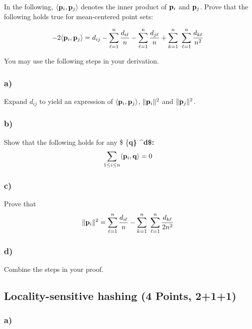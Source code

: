 \documentclass[11pt]{article}
\begin{document}
In the following, \(\langle {\bf p}_i , {\bf p}_j \rangle\) denotes the
inner product of \({\bf p}_i\) and \({\bf p}_j\). Prove that the
following holds true for mean-centered point sets:

\[-2 \langle {\bf p}_i , {\bf p}_j \rangle = 
d_{ij}
- \sum_{\ell=1}^{n} \frac{d_{i\ell}}{n}   
-  \sum_{\ell=1}^{n} \frac{d_{j\ell}}{n} 
+ \sum_{k=1}^{n}~ \sum_{\ell=1}^{n} \frac{d_{k\ell}}{n^2} 
\]

You may use the following steps in your derivation.

\hypertarget{a}{%
\subsubsection{a)}\label{a}}

Expand \(d_{ij}\) to yield an expression of
\(\langle {\bf p}_i, {\bf p}_j \rangle\), \(\|{\bf p}_i\|^2\) and
\(\|{\bf p}_j\|^2\).

\hypertarget{b}{%
\subsubsection{b)}\label{b}}

Show that the following holds for any \$ \{\bf q\}
\in {}\^{}d\$:
\[ \sum_{1 \leq i \leq n} \langle {\bf p}_i , {\bf q} \rangle =   0\]

\hypertarget{c}{%
\subsubsection{c)}\label{c}}

Prove that
\[ \|{\bf p}_i\|^2 = \sum_{\ell=1}^{n} \frac{d_{i\ell}}{n} - \sum_{k=1}^{n}~ \sum_{\ell=1}^{n} \frac{d_{k\ell}}{2n^2}\]

\hypertarget{d}{%
\subsubsection{d)}\label{d}}

Combine the steps in your proof.

    \hypertarget{locality-sensitive-hashing-4-points-211}{%
\subsection{Locality-sensitive hashing (4 Points,
2+1+1)}\label{locality-sensitive-hashing-4-points-211}}

\hypertarget{a}{%
\subsubsection{a)}\label{a}}
\end{document}

